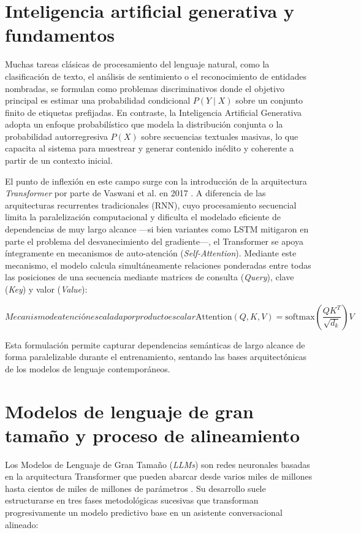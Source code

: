 \section{Inteligencia artificial generativa y fundamentos}
\label{sec:ia_generativa}
Muchas tareas clásicas de procesamiento del lenguaje natural, como la clasificación de texto, el análisis de sentimiento o el reconocimiento de entidades nombradas, se formulan como problemas discriminativos donde el objetivo principal es estimar una probabilidad condicional $P(Y \mid X)$ sobre un conjunto finito de etiquetas prefijadas. En contraste, la Inteligencia Artificial Generativa adopta un enfoque probabilístico que modela la distribución conjunta o la probabilidad autorregresiva $P(X)$ sobre secuencias textuales masivas, lo que capacita al sistema para muestrear y generar contenido inédito y coherente a partir de un contexto inicial.

El punto de inflexión en este campo surge con la introducción de la arquitectura \textit{Transformer} por parte de Vaswani et al. en 2017 \cite{vaswani2017attention}. A diferencia de las arquitecturas recurrentes tradicionales (RNN), cuyo procesamiento secuencial limita la paralelización computacional y dificulta el modelado eficiente de dependencias de muy largo alcance —si bien variantes como LSTM mitigaron en parte el problema del desvanecimiento del gradiente—, el Transformer se apoya íntegramente en mecanismos de auto-atención (\textit{Self-Attention}). Mediante este mecanismo, el modelo calcula simultáneamente relaciones ponderadas entre todas las posiciones de una secuencia mediante matrices de consulta (\textit{Query}), clave (\textit{Key}) y valor (\textit{Value}):

\begin{equation}[EQ:SELFATTENTION]{Mecanismo de atención escalada por producto escalar}
    \text{Attention}(Q, K, V) = \text{softmax}\left(\frac{QK^T}{\sqrt{d_k}}\right)V
\end{equation}

Esta formulación permite capturar dependencias semánticas de largo alcance de forma paralelizable durante el entrenamiento, sentando las bases arquitectónicas de los modelos de lenguaje contemporáneos.

\section{Modelos de lenguaje de gran tamaño y proceso de alineamiento}
\label{sec:llms}
Los Modelos de Lenguaje de Gran Tamaño (\textit{LLMs}) son redes neuronales basadas en la arquitectura Transformer que pueden abarcar desde varios miles de millones hasta cientos de miles de millones de parámetros \cite{achiam2023gpt4, dubey2024llama}. Su desarrollo suele estructurarse en tres fases metodológicas sucesivas que transforman progresivamente un modelo predictivo base en un asistente conversacional alineado:

